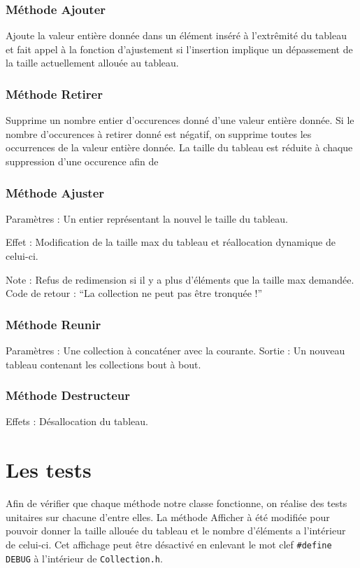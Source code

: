 \documentclass[11pt]{article}
\begin{document}
\subsubsection*{Méthode Ajouter}
Ajoute la valeur entière donnée dans un élément inséré à l'extrêmité du tableau et fait appel à la fonction d'ajustement si l'insertion implique un dépassement de la taille actuellement allouée au tableau.

\subsubsection*{Méthode Retirer}
Supprime un nombre entier d'occurences donné d'une valeur entière donnée. Si le nombre d'occurences à retirer donné est négatif, on supprime toutes les occurrences de la valeur entière donnée. La taille du tableau est réduite à chaque suppression d'une occurence afin de 

\subsubsection*{Méthode Ajuster}
Paramètres : Un entier représentant la nouvel le taille du tableau.

\noindent Effet : Modification de la taille max du tableau et réallocation dynamique de celui-ci.

\noindent Note : Refus de redimension si il y a plus d’éléments que la taille max demandée. Code de retour : “La collection ne peut pas être tronquée !”
    
\subsubsection*{Méthode Reunir}
Paramètres : Une collection à concaténer avec la courante.
\noindent Sortie : Un nouveau tableau contenant les collections bout à bout.

\subsubsection*{Méthode Destructeur}
\noindent Effets : Désallocation du tableau.
\newpage
\section{Les tests}
Afin de vérifier que chaque méthode  notre classe fonctionne, on réalise des tests unitaires sur chacune d'entre elles. La méthode Afficher à été modifiée pour pouvoir donner la taille allouée du tableau et le nombre d'éléments a l'intérieur de celui-ci. Cet affichage peut être désactivé en enlevant le mot clef \texttt{\#define DEBUG} à l'intérieur de \texttt{Collection.h}.
\end{document}
